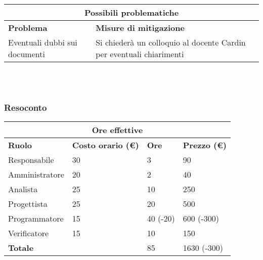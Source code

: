 \documentclass[a4paper, 12pt]{article}
\begin{document}
\begin{center}
    \begin{tabularx}{\textwidth}{|X|X|}
        \hline
        \multicolumn{2}{|c|}{\textbf{Possibili problematiche}}\\
        \hline
        \hline
        \textbf{Problema} & \textbf{Misure di mitigazione}\\
        \hline
        Eventuali dubbi sui documenti & Si chiederà un colloquio al docente Cardin per eventuali chiarimenti\\
        \hline
    \end{tabularx}\\[8pt]
    \mbox{}\\
\end{center}

\subsubsection{Resoconto}\mbox{}

\begin{center}
    \begin{tabularx}{\textwidth}{|X|X|X|X|}
        \hline
        \multicolumn{4}{|c|}{\textbf{Ore effettive}}\\
        \hline
        \hline
        \textbf{Ruolo} & \textbf{Costo orario (\euro)} & \textbf{Ore} & \textbf{Prezzo (\euro)}\\
        \hline
        Responsabile    & 30 & 3  & 90\\
        \hline
        Amministratore  & 20 & 2  & 40\\
        \hline
        Analista        & 25 & 10  & 250\\
        \hline
        Progettista     & 25 & 20  & 500\\
        \hline
        Programmatore   & 15 & 40 (-20) & 600 (-300)\\
        \hline
        Verificatore    & 15 & 10  & 150\\
        \hline
        \hline
        \textbf{Totale} &    & 85 & 1630 (-300)\\
        \hline
    \end{tabularx}\\[8pt]
    \mbox{}\\
\end{center}
\end{document}
